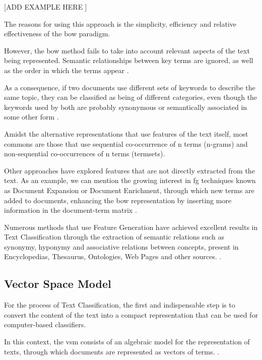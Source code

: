 [ADD EXAMPLE HERE ]

The reasons for using this approach is the simplicity, efficiency and relative effectiveness of the \gls{bow} paradigm.

However, the \gls{bow} method fails to take into account relevant aspects of the text being represented. Semantic relationships between key terms are ignored, as well as the order in which the terms appear \cite{Gabrilovich:2005, Lan:2009}.

As a consequence, if two documents use different sets of keywords to describe the same topic, they can be classified as being of different categories, even though the keywords used by both are probably synonymous or semantically associated in some other form \cite {Hu:2009}.

Amidst the alternative representations that use features of the text itself, most commons are those that use sequential co-occurrence of n terms (n-grams) and non-sequential co-occurrences of n terms (termsets). 

Other approaches have explored features that are not directly extracted from the text. As an example, we can mention the growing interest in \gls{fg} techniques known as Document Expansion or Document Enrichment, through which new terms are added to documents, enhancing the \gls{bow} representation by inserting more information in the document-term matrix \cite {Gabrilovich:2005}.

Numerous methods that use Feature Generation have achieved excellent results in Text Classification through the extraction of semantic relations such as synonymy, hyponymy and associative relations between concepts, present in Encyclopedias, Thesaurus, Ontologies, Web Pages and other sources. \cite{Gabrilovich:2005,Gabrilovich:2006,Hu:2008,Wang:2008, Wang:2009}.

\subsection{\hspace*{3pt}Vector Space Model}

For the process of Text Classification, the first and indispensable step is to convert the content of the text into a compact representation that can be used for computer-based classifiers.

 
In this context, the \gls{vsm} consists of an algebraic model for the representation of texts, through which documents are represented as vectors of terms. \cite{Lan:2009,Salton:1988,supreethi2010novel}.

